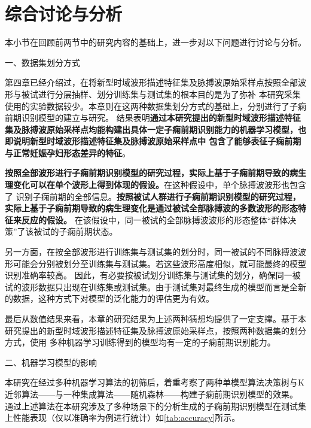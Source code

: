 \section{综合讨论与分析}
本小节在回顾前两节中的研究内容的基础上，进一步对以下问题进行讨论与分析。

一、数据集划分方式

第四章已经介绍过，在将新型时域波形描述特征集及脉搏波原始采样点按照全部波形与被试进行分层抽样、划分训练集与测试集的根本目的是为了弥补
本研究采集使用的实验数据较少。本章则在这两种数据集划分方式的基础上，分别进行了子痫前期识别模型的建立与研究。
结果表明\textbf{通过本研究提出的新型时域波形描述特征集及脉搏波原始采样点均能构建出具体一定子痫前期识别能力的机器学习模型，也即说明新型时域波形描述特征集及脉搏波原始采样点中
包含了能够表征子痫前期与正常妊娠孕妇形态差异的特征}。

\textbf{按照全部波形进行子痫前期识别模型的研究过程，实际上基于子痫前期导致的病生理变化可以在单个波形上得到体现的假设。}在这种假设中，单个脉搏波波形也包含了
识别子痫前期的全部信息。\textbf{按照被试人群进行子痫前期识别模型的研究过程，实际上基于子痫前期导致的病生理变化是通过被试全部脉搏波的多数波形的形态特征来反应的假设。}
在该假设中，同一被试的全部脉搏波波形的形态整体“群体决策”了该被试的子痫前期状态。

另一方面，在按全部波形进行训练集与测试集的划分时，同一被试的不同脉搏波波形可能会分别被划分至训练集与测试集。若这些波形高度相似，就可能最终的模型识别准确率较高。
因此，有必要按被试划分训练集与测试集的划分，确保同一被试的波形数据只出现在训练集或测试集。由于测试集对最终生成的模型而言是全新的数据，这种方式下对模型的泛化能力的评估更为有效。

最后从数值结果来看，本章的研究结果为上述两种猜想均提供了一定支撑。基于本研究提出的新型时域波形描述特征集及脉搏波原始采样点，按照两种数据集的划分方式，使用
多种机器学习训练得到的模型均有一定的子痫前期识别能力。

二、机器学习模型的影响

本研究在经过多种机器学习算法的初筛后，着重考察了两种单模型算法决策树与K近邻算法——与一种集成算法——随机森林——构建子痫前期识别模型的效果。
通过上述算法在本研究涉及了多种场景下的分析生成的子痫前期识别模型在测试集上性能表现（仅以准确率为例进行统计）如\autoref{tab:accuracy}所示。


